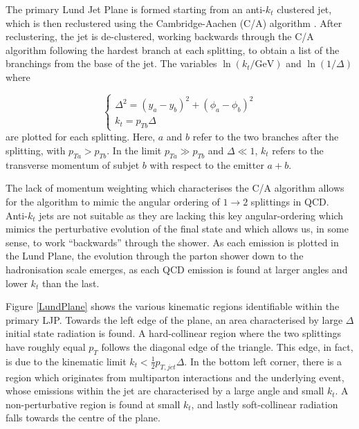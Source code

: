 \documentclass[10pt,a4paper]{book}
\begin{document}
The primary Lund Jet Plane is formed starting from an anti-$k_t$ clustered jet, which is then reclustered using the Cambridge-Aachen (C/A) algorithm \cite{Atkin:2015msa}. After reclustering, the jet is de-clustered, working backwards through the C/A algorithm following the hardest branch at each splitting, to obtain a list of the branchings from the base of the jet. The variables $\ln(k_t /\text{GeV})$ and $\ln(1/\Delta)$ where

\begin{equation}
\begin{cases}
\Delta^2 = (y_a - y_b)^2 + (\phi_a - \phi_b)^2 \\
k_t = p_{Tb}\Delta 
\end{cases}
\label{delta kt}
\end{equation}
are plotted for each splitting. Here, $a$ and $b$ refer to the two branches after the splitting, with $p_{Ta} > p_{Tb}$. In the limit $p_{Ta} \gg p_{Tb}$ and $\Delta \ll 1$, $k_t$ refers to the transverse momentum of subjet $b$ with respect to the emitter $a+b$.

The lack of momentum weighting which characterises the C/A algorithm allows for the algorithm to mimic the angular ordering of $1 \rightarrow 2$ splittings in QCD. Anti-$k_t$ jets are not suitable as they are lacking this key angular-ordering which mimics the perturbative evolution of the final state and which allows us, in some sense, to work ``backwards'' through the shower. As each emission is plotted in the Lund Plane, the evolution through the parton shower down to the hadronisation scale emerges, as each QCD emission is found at larger angles and lower $k_t$ than the last.

Figure \ref{LundPlane} shows the various kinematic regions identifiable within the primary LJP. Towards the left edge of the plane, an area characterised by large $\Delta$ initial state radiation is found. A hard-collinear region where the two splittings have roughly equal $p_T$ follows the diagonal edge of the triangle. This edge, in fact, is due to the kinematic limit $k_t < \frac{1}{2}p_{T,jet}\Delta$. In the bottom left corner, there is a region which originates from multiparton interactions and the underlying event, whose emissions within the jet are characterised by a large angle and small $k_t$. A non-perturbative region is found at small $k_t$, and lastly soft-collinear radiation falls towards the centre of the plane.
\end{document}

